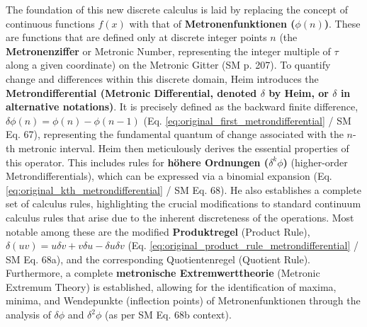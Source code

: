 \documentclass[12pt]{article}
\newcommand{\metron}{\tau}
\newcommand{\metrondifferential}{\delta}
\newcommand{\metronenfunktion}{\phi(n)}
\newcommand{\metronenziffer}{n}
\begin{document}
The foundation of this new discrete calculus is laid by replacing the concept of continuous functions \( f(x) \) with that of \textbf{Metronenfunktionen (\( \metronenfunktion \))}. These are functions that are defined only at discrete integer points \( \metronenziffer \) (the \textbf{Metronenziffer} or Metronic Number, representing the integer multiple of \( \metron \) along a given coordinate) on the Metronic Gitter (SM p. 207). To quantify change and differences within this discrete domain, Heim introduces the \textbf{Metrondifferential (Metronic Differential, denoted \( \metrondifferential \) by Heim, or \( \delta \) in alternative notations)}. It is precisely defined as the backward finite difference, \( \metrondifferential\phi(\metronenziffer) = \phi(\metronenziffer) - \phi(\metronenziffer-1) \) (Eq. \eqref{eq:original_first_metrondifferential} / SM Eq. 67), representing the fundamental quantum of change associated with the \( \metronenziffer \)-th metronic interval. Heim then meticulously derives the essential properties of this operator. This includes rules for \textbf{höhere Ordnungen (\( \metrondifferential^k\phi \))} (higher-order Metrondifferentials), which can be expressed via a binomial expansion (Eq. \eqref{eq:original_kth_metrondifferential} / SM Eq. 68). He also establishes a complete set of calculus rules, highlighting the crucial modifications to standard continuum calculus rules that arise due to the inherent discreteness of the operations. Most notable among these are the modified \textbf{Produktregel} (Product Rule), \( \metrondifferential(uv) = u\metrondifferential v + v\metrondifferential u - \metrondifferential u\metrondifferential v \) (Eq. \eqref{eq:original_product_rule_metrondifferential} / SM Eq. 68a), and the corresponding Quotientenregel (Quotient Rule). Furthermore, a complete \textbf{metronische Extremwerttheorie} (Metronic Extremum Theory) is established, allowing for the identification of maxima, minima, and Wendepunkte (inflection points) of Metronenfunktionen through the analysis of \( \metrondifferential\phi \) and \( \metrondifferential^2\phi \) (as per SM Eq. 68b context).
\end{document}

